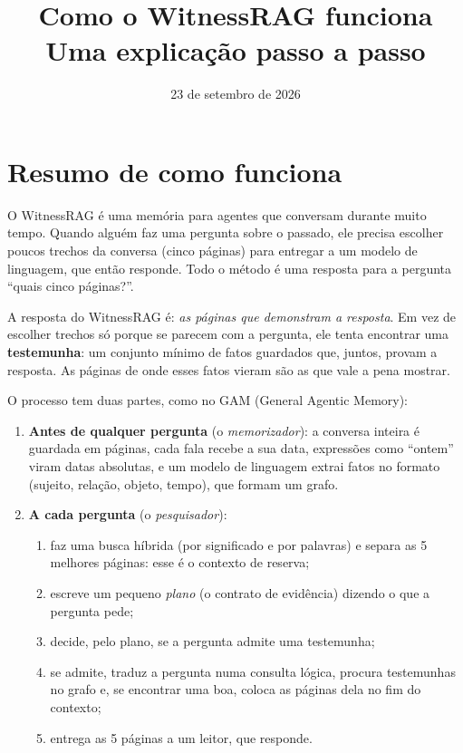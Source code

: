 \documentclass[11pt]{article}
\title{\textbf{Como o WitnessRAG funciona}\\[2pt]\large Uma explicação passo a passo}
\author{}
\date{23 de setembro de 2026}
\begin{document}
\maketitle
\tableofcontents

\section{Resumo de como funciona}\label{sec:resumo}

O WitnessRAG é uma memória para agentes que conversam durante muito tempo.
Quando alguém faz uma pergunta sobre o passado, ele precisa escolher poucos
trechos da conversa (cinco páginas) para entregar a um modelo de linguagem,
que então responde. Todo o método é uma resposta para a pergunta ``quais
cinco páginas?''.

A resposta do WitnessRAG é: \emph{as páginas que demonstram a resposta}. Em
vez de escolher trechos só porque se parecem com a pergunta, ele tenta
encontrar uma \textbf{testemunha}: um conjunto mínimo de fatos guardados que,
juntos, provam a resposta. As páginas de onde esses fatos vieram são as que
vale a pena mostrar.

O processo tem duas partes, como no GAM (General Agentic Memory):

\begin{enumerate}[leftmargin=*]
\item \textbf{Antes de qualquer pergunta} (o \emph{memorizador}): a conversa
inteira é guardada em páginas, cada fala recebe a sua data, expressões como
``ontem'' viram datas absolutas, e um modelo de linguagem extrai fatos no
formato (sujeito, relação, objeto, tempo), que formam um grafo.
\item \textbf{A cada pergunta} (o \emph{pesquisador}):
\begin{enumerate}[label=(\alph*), nosep]
\item faz uma busca híbrida (por significado e por palavras) e separa as 5
melhores páginas: esse é o contexto de reserva;
\item escreve um pequeno \emph{plano} (o contrato de evidência) dizendo o
que a pergunta pede;
\item decide, pelo plano, se a pergunta admite uma testemunha;
\item se admite, traduz a pergunta numa consulta lógica, procura testemunhas
no grafo e, se encontrar uma boa, coloca as páginas dela no fim do contexto;
\item entrega as 5 páginas a um leitor, que responde.
\end{enumerate}
\end{enumerate}
\end{document}
